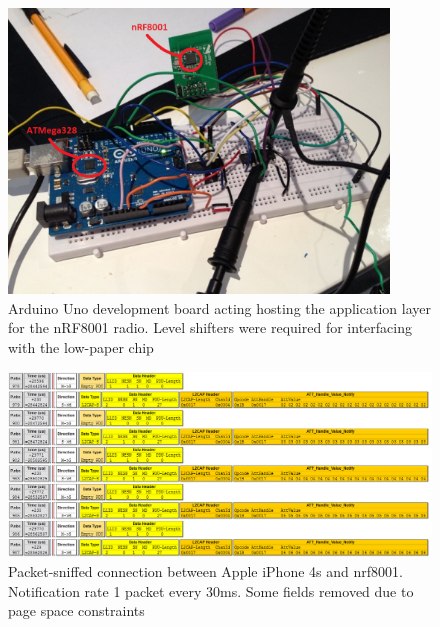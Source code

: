 \documentclass[]{article}
\begin{document}
{\begin{figure}[H]
	\begin{center}
		\includegraphics[width = 0.9\textwidth]{nrf8001}
	\end{center}
	\caption{Arduino Uno development board acting hosting the application layer for the nRF8001 radio. Level shifters were required for interfacing with the low-paper chip}
	\label{fig:nrf8001}
\end{figure}

\begin{figure}[H]
	\begin{center}
		\includegraphics[width = 1.4\textwidth, angle=90]{nrfcap}
	\end{center}
	\caption{Packet-sniffed connection between Apple iPhone 4s and nrf8001. Notification rate 1 packet every 30ms. Some fields removed due to page space constraints}
	\label{fig:nrfcap}
\end{figure}

}
\end{document}
